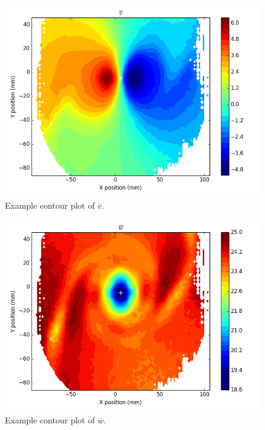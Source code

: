 {\begin{figure}[H]
	\centering
	\includegraphics[width=5in]{figs/example_vortex_figs/example_V_contour}
\caption{Example contour plot of $\overline{v}$.}
\label{fig:examp_V}
\end{figure}

\begin{figure}[H]
	\centering
	\includegraphics[width=5in]{figs/example_vortex_figs/example_W_contour}
\caption{Example contour plot of $\overline{w}$.}
\label{fig:examp_W}
\end{figure}

}
